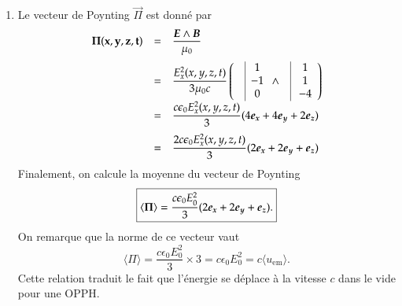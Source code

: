 \begin{corrige}
\begin{enumerate}
	\item Le vecteur de Poynting $\vec{\Pi}$ est donné par 
	      \begin{equation*}
		      \begin{array}{rcl}
			      \vec{\Pi(x, y, z, t)} &=& \dfrac{\vece \wedge \vecb}
			      {\mu_0} \\[1.2em]
		      	      &=& \dfrac{E_x^2(x, y, z, t)}{3\mu_0c} \left(
			      \quad \vline
			      \begin{array}{c}
				      1 \\
				      - 1 \\
				      0
			      \end{array}
			      \wedge \quad
			      \vline
			      \begin{array}{c}
				      1 \\
				      1 \\
				      -4
			      \end{array}
		      \right) \\[1.2em] 
			&=& \dfrac{c \epsilon_0 E_x^2(x, y, z, t)}
			{3}(4\ex + 4\ey + 2\ez) \\[1em]
			&=& \dfrac{2 c \epsilon_0 E_x^2(x, y, z, t)}
			{3}(2\ex + 2\ey + \ez)
	      \end{array}
	      \end{equation*}
	      Finalement, on calcule la moyenne du vecteur de Poynting
	      \begin{equation*}
		      \boxed{
		      \langle \vec{\Pi} \rangle = 
		      \dfrac{c \epsilon_0 E_0^2}{3}(2\ex + 2\ey + \ez).
	      }
      	      \end{equation*}
	      On remarque que la norme de ce vecteur vaut
	      \begin{equation*}
		      \langle \Pi \rangle = \dfrac{c \epsilon_0 E_0^2}{3} \times 3
		      = c \epsilon_0 E_0^2 = c \langle u_\mathrm{em} \rangle.
	      \end{equation*}
	      Cette relation traduit le fait que l'énergie se déplace à la vitesse
	      $c$ dans le vide pour une OPPH.
\end{enumerate}
\end{corrige}

